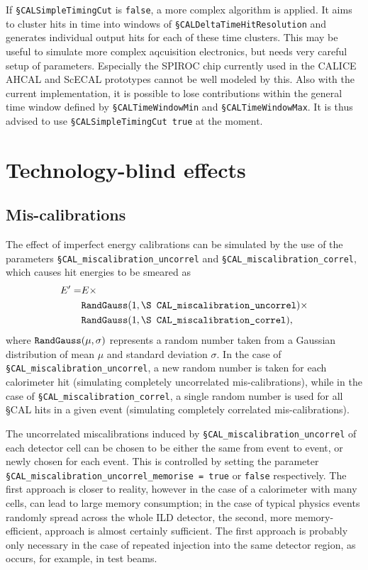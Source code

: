 \documentclass[12pt]{article} %
\begin{document}
If {\tt \S CALSimpleTimingCut} is {\tt false}, a more complex algorithm is applied. 
It aims to cluster hits in time into windows of {\tt \S CALDeltaTimeHitResolution} 
and generates individual output hits for each of these time clusters. This may be useful 
to simulate more complex aqcuisition electronics, but needs very careful setup of parameters. 
Especially the SPIROC chip currently used in the CALICE AHCAL and ScECAL prototypes cannot be well 
modeled by this. Also with the current implementation, it is possible to lose contributions 
within the general time window defined by {\tt \S CALTimeWindowMin} and {\tt \S CALTimeWindowMax}. 
It is thus advised to use {\tt \S CALSimpleTimingCut true} at the moment.


\section{Technology-blind effects}
\label{sec:common}

\subsection{Mis-calibrations}
The effect of imperfect energy calibrations can be simulated by the use of the parameters
{\tt \S CAL\_miscalibration\_uncorrel} and {\tt \S CAL\_miscalibration\_correl}, which causes hit energies to
be smeared as 
\begin{equation*}
\begin{split}
E' = & E \times \\
& \text{\tt RandGauss} ( 1, \text{\tt \S CAL\_miscalibration\_uncorrel}) \times \\
& \text{\tt RandGauss} ( 1, \text{\tt \S CAL\_miscalibration\_correl}) ,
\end{split}
\end{equation*}
where $\text{\tt RandGauss} (\mu, \sigma)$ represents a random number taken from a Gaussian distribution of mean $\mu$ and 
standard deviation $\sigma$. In the case of {\tt \S CAL\_miscalibration\_uncorrel}, a new random number is taken for each 
calorimeter hit (simulating completely uncorrelated mis-calibrations), 
while in the case of {\tt \S CAL\_miscalibration\_correl}, a single random number is used for all \S CAL 
hits in a given event (simulating completely correlated mis-calibrations).

The uncorrelated miscalibrations induced by {\tt \S CAL\_miscalibration\_uncorrel} of each detector cell can be chosen to be either 
the same from event to event, or newly chosen for each event. 
This is controlled by setting the parameter {\tt \S CAL\_miscalibration\_uncorrel\_memorise = true} or {\tt false} respectively.
The first approach is closer to reality, however in the case of a calorimeter with many cells, can lead to large memory consumption;
in the case of typical physics events randomly spread across the whole ILD detector, the second, more memory-efficient, 
approach is almost certainly sufficient. The first approach is probably only necessary in the case of repeated injection into the same detector
region, as occurs, for example, in test beams.
\end{document}

